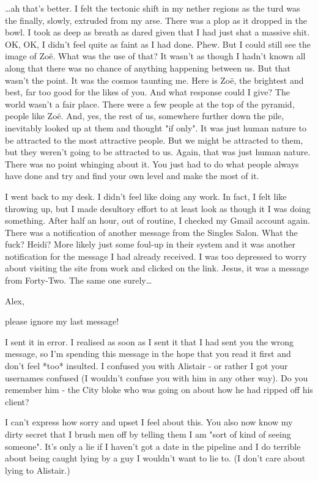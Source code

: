 {\dots}ah that's better. I felt the tectonic shift in my nether
regions as the turd was the finally, slowly, extruded from my arse.
There was a plop as it dropped in the bowl. I took as deep as breath
as dared given that I had just shat a massive shit. OK, OK, I didn't
feel quite as faint as I had done. Phew. But I could still see the
image of Zoë. What was the use of that? It wasn't as though I
hadn't known all along that there was no chance of anything
happening between us. But that wasn't the point. It was the cosmos
taunting me. Here is Zoë, the brightest and best, far too good
for the likes of {\twelveit you}. And what response could I give?
The world wasn't a fair place. There were a few people at the top of
the pyramid, people like Zoë. And, yes, the rest of us,
somewhere further down the pile, inevitably looked up at them and
thought "if only". It was just human nature to be attracted to the
most attractive people. But we might be attracted to them, but they
weren't going to be attracted to us. Again, that was just human
nature. There was no point whinging about it. You just had to do
what people always have done and try and find your own level and
make the most of it.

I went back to my desk. I didn't feel like doing any work. In fact,
I felt like throwing up, but I made desultory effort to at least
look as though it I was doing something. After half an hour, out of
routine, I checked my Gmail account again. There was a notification
of another message from the Singles Salon. What the fuck? Heidi?
More likely just some foul-up in their system and it was another
notification for the message I had already received. I was too
depressed to worry about visiting the site from work and clicked on
the link. Jesus, it was a message from Forty-Two. The same one
surely\dots

\startmessage
Alex,

please ignore my last message!

I sent it in error. I realised as soon as I sent it that I had sent
you the wrong message, so I'm spending this message in the hope that
you read it first and don't feel *too* insulted. I confused you with
Alistair - or rather I got your usernames confused (I wouldn't
confuse you with him in any other way). Do you remember him - the
City bloke who was going on about how he had ripped off his client?

I can't express how sorry and upset I feel about this. You also
now know my dirty secret that I brush men off by telling them I am
"sort of kind of seeing someone". It's only a lie if I haven't got a
date in the pipeline and I do terrible about being caught lying by a
guy I wouldn't want to lie to. (I don't care about lying to
Alistair.)

